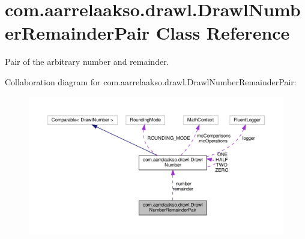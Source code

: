 \hypertarget{classcom_1_1aarrelaakso_1_1drawl_1_1_drawl_number_remainder_pair}{}\section{com.\+aarrelaakso.\+drawl.\+Drawl\+Number\+Remainder\+Pair Class Reference}
\label{classcom_1_1aarrelaakso_1_1drawl_1_1_drawl_number_remainder_pair}


Pair of the arbitrary number and remainder.  




Collaboration diagram for com.\+aarrelaakso.\+drawl.\+Drawl\+Number\+Remainder\+Pair\+:
\nopagebreak
\begin{figure}[H]
\begin{center}
\leavevmode
\includegraphics[width=350pt]{d9/dde/classcom_1_1aarrelaakso_1_1drawl_1_1_drawl_number_remainder_pair__coll__graph}
\end{center}
\end{figure}
